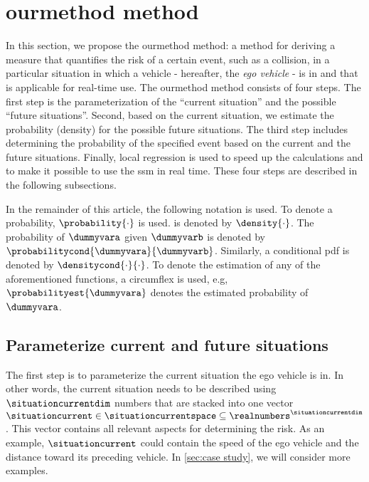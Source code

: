 \section{\acl{ourmethod} method}
\label{sec:method}

In this section, we propose the \cstarta\ac{ourmethod} method: \cenda a method for deriving a measure that quantifies the risk of a certain event, such as a collision, in a particular situation in which a vehicle - hereafter, the \textit{ego vehicle} - is in and that is applicable for real-time use.
\cstarta The \ac{ourmethod} method \cenda consists of four steps. 
The first step is the parameterization of the ``current situation'' and the possible ``future situations''.
Second, based on the current situation, we estimate the probability (density) for the possible future situations. 
The third step includes determining the probability of the specified event based on the current and the future situations.
Finally, local regression is used to speed up the calculations and to make it possible to use the \ac{ssm} in real time. 
These four steps are described in the following subsections.

In the remainder of this article, the following notation is used. 
To denote a probability, $\probability{\cdot}$ is used. 
 is denoted by $\density{\cdot}$. 
The probability of $\dummyvara$ given $\dummyvarb$ is denoted by $\probabilitycond{\dummyvara}{\dummyvarb}$.
Similarly, a conditional \ac{pdf} is denoted by $\densitycond{\cdot}{\cdot}$. 
To denote the estimation of any of the aforementioned functions, a circumflex is used, e.g, $\probabilityest{\dummyvara}$ denotes the estimated probability of $\dummyvara$.



\subsection{Parameterize current and future situations}
\label{sec:parametrization}

The first step is to parameterize the current situation the ego vehicle is in. 
In other words, the current situation needs to be described using $\situationcurrentdim$ numbers that are stacked into one vector $\situationcurrent \in \situationcurrentspace \subseteq \realnumbers^{\situationcurrentdim}$. 
\cstartb This vector contains all relevant aspects for determining the risk. \cendb
As an example, $\situationcurrent$ could contain the speed of the ego vehicle and the distance toward its preceding vehicle. 
In \cref{sec:case study}, we will consider more examples.

